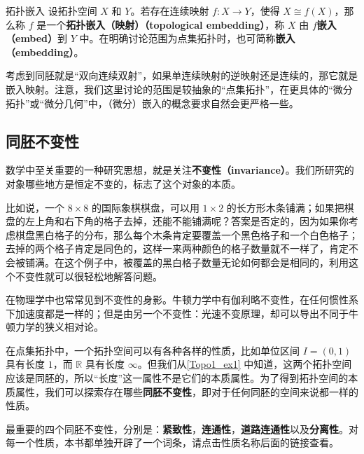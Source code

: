\begin{definition}{拓扑嵌入}
设拓扑空间 $X$ 和 $Y$。若存在连续映射 $f:X\rightarrow Y$，使得 $X\cong f(X)$，那么称 $f$ 是一个\textbf{拓扑嵌入（映射）（topological embedding）}，称 $X$ 由 $f$\textbf{嵌入（embed）}到 $Y$ 中。在明确讨论范围为点集拓扑时，也可简称\textbf{嵌入（embedding）}。
\end{definition}

考虑到同胚就是“双向连续双射”，如果单连续映射的逆映射还是连续的，那它就是嵌入映射。注意，我们这里讨论的范围是较抽象的“点集拓扑”，在更具体的“微分拓扑”或“微分几何”中，（微分）嵌入的概念要求自然会更严格一些。




\subsection{同胚不变性}

数学中至关重要的一种研究思想，就是关注\textbf{不变性（invariance）}。我们所研究的对象哪些地方是恒定不变的，标志了这个对象的本质。

比如说，一个 $8\times8$ 的国际象棋棋盘，可以用 $1\times2$ 的长方形木条铺满；如果把棋盘的左上角和右下角的格子去掉，还能不能铺满呢？答案是否定的，因为如果你考虑棋盘黑白格子的分布，那么每个木条肯定要覆盖一个黑色格子和一个白色格子；去掉的两个格子肯定是同色的，这样一来两种颜色的格子数量就不一样了，肯定不会被铺满。在这个例子中，被覆盖的黑白格子数量无论如何都会是相同的，利用这个不变性就可以很轻松地解答问题。

在物理学中也常常见到不变性的身影。牛顿力学中有伽利略不变性，在任何惯性系下加速度都是一样的；但是由另一个不变性：光速不变原理，却可以导出不同于牛顿力学的狭义相对论。

在点集拓扑中，一个拓扑空间可以有各种各样的性质，比如单位区间 $I=(0,1)$ 具有长度 $1$，而 $\mathbb{R}$ 具有长度 $\infty$。但我们从\autoref{Topo1_ex1} 中知道，这两个拓扑空间应该是同胚的，所以“长度”这一属性不是它们的本质属性。为了得到拓扑空间的本质属性，我们可以探索存在哪些\textbf{同胚不变性}，即对于任何同胚的空间来说都一样的性质。

最重要的四个同胚不变性，分别是：\textbf{紧致性}，\textbf{连通性}，\textbf{道路连通性}以及\textbf{分离性}。对每一个性质，本书都单独开辟了一个词条，请点击性质名称后面的链接查看。
